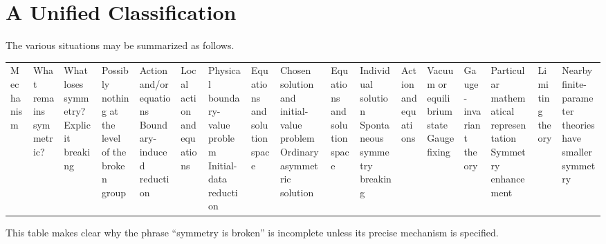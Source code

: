 \section{ A Unified Classification}
The various situations may be summarized as follows.
\begin{center}
\begin{tabular}{p{}|p{}|p{}}
\hline
Mechanism & What remains symmetric? & What loses symmetry?\
\hline
Explicit breaking &
Possibly nothing at the level of the broken group &
Action and/or equations\
\hline
Boundary-induced reduction &
Local action and equations &
Physical boundary-value problem\
\hline
Initial-data reduction &
Equations and solution space &
Chosen solution and initial-value problem\
\hline
Ordinary asymmetric solution &
Equations and solution space &
Individual solution\
\hline
Spontaneous symmetry breaking &
Action and equations &
Vacuum or equilibrium state\
\hline
Gauge fixing &
Gauge-invariant theory &
Particular mathematical representation\
\hline
Symmetry enhancement &
Limiting theory &
Nearby finite-parameter theories have smaller symmetry\
\hline
\end{tabular}
\end{center}
This table makes clear why the phrase ``symmetry is broken'' is incomplete unless its precise mechanism is specified.

